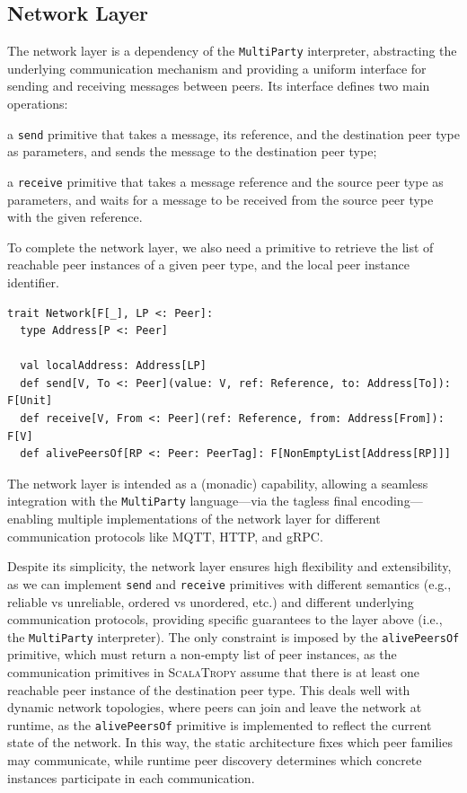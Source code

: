 \documentclass[runningheads]{llncs}
\newcommand{\ourLang}{\textsc{ScalaTropy}}
\newcommand{\code}[1]{\lstinline[style=scala3,basicstyle=\ttfamily\small\color{vscLightText}]{#1}}
\newcommand{\diff}[1]{{#1}}
\begin{document}
\subsection{Network Layer}
The network layer is a dependency of the \code{MultiParty} interpreter,
abstracting the underlying communication mechanism and providing a uniform interface for sending and receiving messages between peers.
%
Its interface defines two main operations:
\begin{enumerate*}[label=(\roman*)]
  \item a \code{send} primitive that takes a message, its reference, and the destination peer type as parameters, and sends the message to the destination peer type;
  \item a \code{receive} primitive that takes a message reference and the source peer type as parameters, and waits for a message to be received from the source peer type with the given reference.
\end{enumerate*}
To complete the network layer,
we also need a primitive to retrieve the list of reachable peer instances of a given peer type,
and the local peer instance identifier.
\begin{lstlisting}[style=scala3]
trait Network[F[_], LP <: Peer]:
  type Address[P <: Peer]

  val localAddress: Address[LP]
  def send[V, To <: Peer](value: V, ref: Reference, to: Address[To]): F[Unit]
  def receive[V, From <: Peer](ref: Reference, from: Address[From]): F[V]
  def alivePeersOf[RP <: Peer: PeerTag]: F[NonEmptyList[Address[RP]]]
\end{lstlisting}
The network layer is intended as a (monadic) capability,
allowing a seamless integration with the \code{MultiParty} language---via the tagless final encoding---enabling multiple implementations of the network layer for different communication protocols like MQTT, HTTP, and gRPC.

Despite its simplicity,
the network layer ensures high flexibility and extensibility,
as we can implement \code{send} and \code{receive} primitives with different semantics (e.g., reliable vs unreliable, ordered vs unordered, etc.) and different underlying communication protocols,
providing specific guarantees to the layer above (i.e., the \code{MultiParty} interpreter).
%
The only constraint is imposed by the \code{alivePeersOf} primitive,
which must return a non-empty list of peer instances,
as the communication primitives in \ourLang{} assume that there is at least one reachable peer instance of the destination peer type.
%
This deals well with dynamic network topologies,
where peers can join and leave the network at runtime,
as the \code{alivePeersOf} primitive is implemented to reflect the current state of the network.
%
\diff{In this way, the static architecture fixes which peer families may communicate, while runtime peer discovery determines which concrete instances participate in each communication.}
\end{document}
